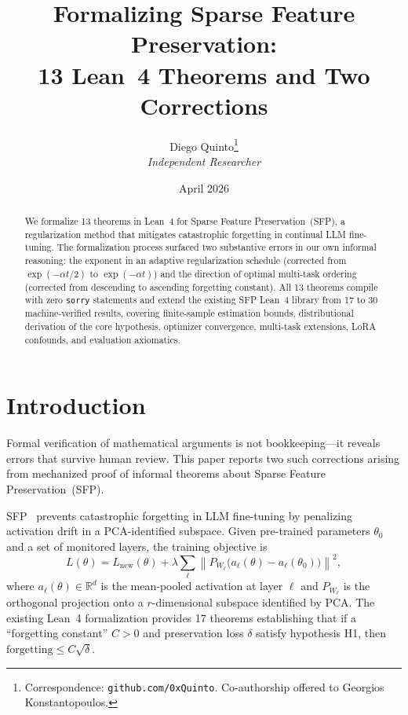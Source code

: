 \documentclass[11pt,a4paper]{article}
\title{Formalizing Sparse Feature Preservation:\\
13 Lean~4 Theorems and Two Corrections}
\author{
  Diego Quinto\thanks{Correspondence: \texttt{github.com/0xQuinto}. Co-authorship offered to Georgios Konstantopoulos.} \\
  \textit{Independent Researcher}
}
\date{April 2026}
\theoremstyle{definition}
\newcommand{\R}{\mathbb{R}}
\newcommand{\proj}[1]{P_{#1}}
\newcommand{\norm}[1]{\left\|#1\right\|}
\begin{document}
\maketitle

\begin{abstract}
We formalize 13 theorems in Lean~4 for Sparse Feature Preservation~(SFP), a regularization method that mitigates catastrophic forgetting in continual LLM fine-tuning. The formalization process surfaced two substantive errors in our own informal reasoning: the exponent in an adaptive regularization schedule (corrected from $\exp(-\alpha t/2)$ to $\exp(-\alpha t)$) and the direction of optimal multi-task ordering (corrected from descending to ascending forgetting constant). All 13 theorems compile with zero \texttt{sorry} statements and extend the existing SFP Lean~4 library from 17 to 30 machine-verified results, covering finite-sample estimation bounds, distributional derivation of the core hypothesis, optimizer convergence, multi-task extensions, LoRA confounds, and evaluation axiomatics.
\end{abstract}

\section{Introduction}
\label{sec:intro}

Formal verification of mathematical arguments is not bookkeeping---it reveals errors that survive human review. This paper reports two such corrections arising from mechanized proof of informal theorems about Sparse Feature Preservation~(SFP).

SFP~\citep{sfp2025} prevents catastrophic forgetting in LLM fine-tuning by penalizing activation drift in a PCA-identified subspace. Given pre-trained parameters $\theta_0$ and a set of monitored layers, the training objective is
\begin{equation}
\label{eq:sfp-loss}
L(\theta) = L_{\mathrm{new}}(\theta) + \lambda \sum_\ell \norm{\proj{W_\ell}\!\big(a_\ell(\theta) - a_\ell(\theta_0)\big)}^2,
\end{equation}
where $a_\ell(\theta) \in \R^d$ is the mean-pooled activation at layer $\ell$ and $\proj{W_\ell}$ is the orthogonal projection onto a $r$-dimensional subspace identified by PCA. The existing Lean~4 formalization provides 17 theorems establishing that if a ``forgetting constant'' $C > 0$ and preservation loss $\delta$ satisfy hypothesis H1, then $\text{forgetting} \leq C\sqrt{\delta}$.
\end{document}
